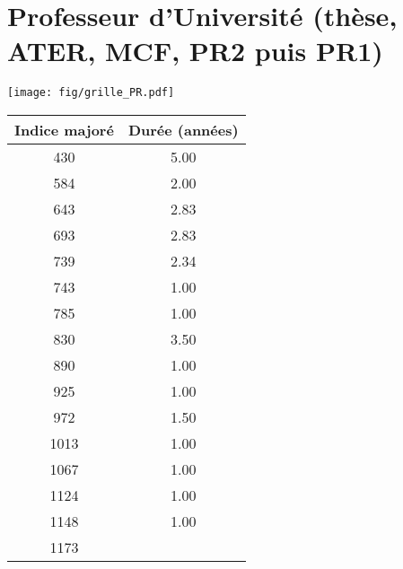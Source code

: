 \newpage 
 
\chapter{Professeur d'Université (thèse, ATER, MCF, PR2 puis PR1)} 

\begin{minipage}{0.55\linewidth}\texttt{[image: fig/grille\_PR.pdf]}\end{minipage} 
\begin{minipage}{0.3\linewidth} 
 \begin{center} 

\begin{tabular}[htb]{|c|c|} 
\hline 
 Indice majoré &  Durée (années) \\ 
\hline \hline 
 430 &  5.00 \\ 
\hline 
 584 &  2.00 \\ 
\hline 
 643 &  2.83 \\ 
\hline 
 693 &  2.83 \\ 
\hline 
 739 &  2.34 \\ 
\hline 
 743 &  1.00 \\ 
\hline 
 785 &  1.00 \\ 
\hline 
 830 &  3.50 \\ 
\hline 
 890 &  1.00 \\ 
\hline 
 925 &  1.00 \\ 
\hline 
 972 &  1.50 \\ 
\hline 
 1013 &  1.00 \\ 
\hline 
 1067 &  1.00 \\ 
\hline 
 1124 &  1.00 \\ 
\hline 
 1148 &  1.00 \\ 
\hline 
 1173 &   \\ 
\hline 
\hline 
\end{tabular} 
\end{center} 
 \end{minipage} 

~\\ 
 


   
 \localtableofcontents 

